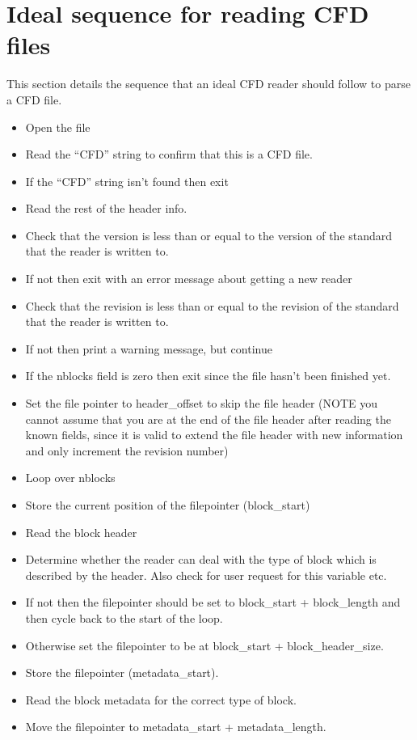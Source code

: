 \documentclass[8pt]{article} \usepackage{url,graphicx,tabularx,array}
\begin{document}
\section{Ideal sequence for reading CFD files}
This section details the sequence that an ideal CFD reader should follow to
parse a CFD file.
\begin{itemize}
\item Open the file
\item Read the ``CFD'' string to confirm that this is a CFD file.
\item If the ``CFD'' string isn't found then exit
\item Read the rest of the header info.
\item Check that the version is less than or equal to the version of the
  standard that the reader is written to.
\item If not then exit with an error message about getting a new reader
\item Check that the revision is less than or equal to the revision of the
  standard that the reader is written to.
\item If not then print a warning message, but continue
\item If the nblocks field is zero then exit since the file hasn't been
  finished yet.
\item Set the file pointer to header\_offset to skip the file header (NOTE you
  cannot assume that you are at the end of the file header after reading the
  known fields, since it is valid to extend the file header with new
  information and only increment the revision number)
\item Loop over nblocks
\item Store the current position of the filepointer (block\_start)
\item Read the block header
\item Determine whether the reader can deal with the type of block which is
  described by the header. Also check for user request for this variable etc.
\item If not then the filepointer should be set to block\_start + block\_length
  and then cycle back to the start of the loop.
\item Otherwise set the filepointer to be at block\_start +
  block\_header\_size.
\item Store the filepointer (metadata\_start).
\item Read the block metadata for the correct type of block.
\item Move the filepointer to metadata\_start + metadata\_length.

\end{itemize}
\end{document}
